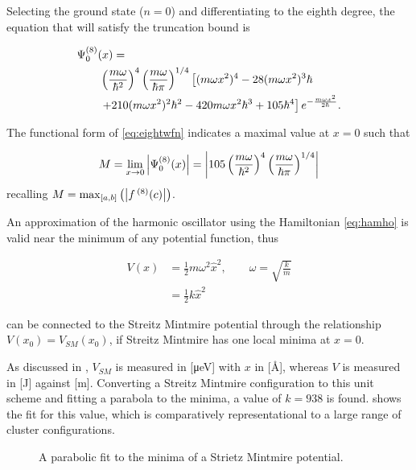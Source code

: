 Selecting the ground state ($n=0$) and differentiating to the eighth degree, the equation that will satisfy the truncation bound is

\begin{align}
\MoveEqLeft \Psi_0^{(8)}(x) = \nonumber\\
&\left(\frac{m\omega}{\hbar^2}\right)^4\left(\frac{m\omega}{\hbar\pi}\right)^{1/4}\left[(m\omega x^2)^4-28 (m\omega x^2)^3\hbar\right.\nonumber\\
&\left.+210(m\omega x^2)^2\hbar ^2-420m\omega x^2\hbar^3+105\hbar^4\right]e^{-\frac{m\omega x^2}{2\hbar}}.
\label{eq:eightwfn}
\end{align}

The functional form of \cref{eq:eightwfn} indicates a maximal value at $x=0$ such that

\begin{equation}
M = \lim_{x \to 0} \left\lvert \Psi_0^{(8)}(x)\right\rvert = \left\lvert 105\left(\frac{m\omega}{\hbar^2}\right)^4\left(\frac{m\omega}{\hbar\pi}\right)^{1/4}\right\rvert
\label{eq:Mlimit}
\end{equation}
recalling $M = \mathrm{max}_{[a,b]}\left(\left\lvert f\,^{(8)}(c)\right\rvert\right)$.

An approximation of the harmonic oscillator using the Hamiltonian \cref{eq:hamho} is valid near the minimum of any potential function, thus

\begin{align}
V(x) &= \frac{1}{2}m\omega^2\hat{x}^2, \qquad \omega=\sqrt{\frac{k}{m}}\label{eq:vharm}\\
     &= \frac{1}{2}k\hat{x}^2
\end{align}

can be connected to the Streitz Mintmire potential through the relationship $V(x_{0})=V_{SM}(x_{0})$, if Streitz Mintmire has one local minima at $x=0$.

As discussed in , $V_{SM}$ is measured in [μeV] with $x$ in [Å], whereas $V$ is measured in [J] against [m].
Converting a Streitz Mintmire configuration to this unit scheme and fitting a parabola to the minima, a value of $k=938$ is found.
 shows the fit for this value, which is comparatively representational to a large range of cluster configurations.

\begin{figure}[htp]
\centering
\hspace{-1cm}\resizebox{0.7\columnwidth}{!}{}
\caption[Harmonic Approximation to Strietz Mintmire]{\label{fig:harmsm}A parabolic fit to the minima of a  Strietz Mintmire potential.}
\end{figure}

